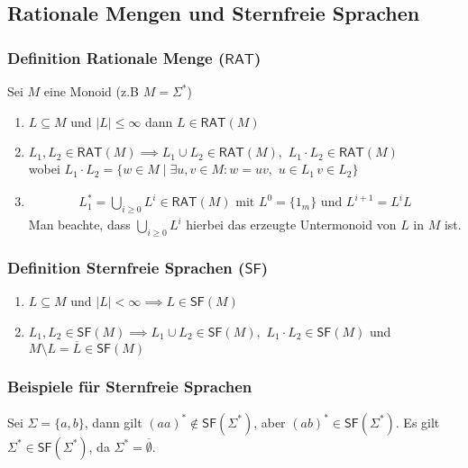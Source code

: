 \documentclass[12pt, german]{article}
\newcommand{\sigstern}{\Sigma^\ast}
\newcommand{\rat}{\mathsf{RAT}}
\newcommand{\starfree}{\mathsf{SF}}
\begin{document}
\subsection{Rationale Mengen und Sternfreie Sprachen}
\subsubsection{Definition Rationale Menge ($\rat$)}
	Sei $M$ eine Monoid (z.B $M = \sigstern$) 
	\begin{enumerate}[label=\arabic*)]
		\item $L \subseteq M $ und $ |L| \leq \infty$ dann $L \in \rat(M)$
		\item $L_1, L_2 \in \rat(M) \implies L_1 \cup L_2 \in \rat(M), \, \, L_1 \cdot L_2 \in \rat(M)$ \\ 
		wobei $ L_1 \cdot L_2 = \{w \in M \mid \exists u,v \in M : w = uv, \, \, u \in L_1 \, v \in L_2\}$
	\item
	\begin{align*}
		L_1^\ast = \bigcup_{i \geq 0} L^i \in \rat(M) \text{ mit } L^0=\{1_m\} \text{ und } L^{i+1} = L^iL
	\end{align*}
	Man beachte, dass $\bigcup_{i \geq 0} L^i $ hierbei das erzeugte Untermonoid von $L$ in $M$ ist.
		\end{enumerate}


\subsubsection{Definition Sternfreie Sprachen ($\starfree$)}
	\begin{enumerate}[label=\arabic*)]
		\item $L \subseteq M $ und $ |L| < \infty \implies L \in \starfree(M)$
		\item $L_1, L_2 \in \starfree(M) \implies L_1 \cup L_2 \in \starfree(M), \, \, L_1 \cdot L_2 \in \starfree(M)$  und $M \setminus L = \overline{L} \in \starfree(M)$\\ 
	\end{enumerate}

\subsubsection{Beispiele für Sternfreie Sprachen}
	Sei $\Sigma = \{a,b\}$, dann gilt $(aa)^\ast \not\in \starfree(\sigstern)$, aber $(ab)^\ast \in \starfree(\sigstern)$. Es gilt $\sigstern \in \starfree(\sigstern)$, da $\sigstern = \overline{\emptyset}$. 
	\newline
	
\end{document}
